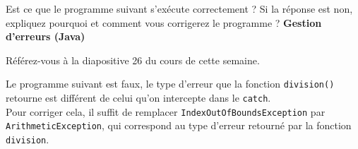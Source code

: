 \begin{Exercice}[5 minutes] Est ce que le programme suivant s'exécute correctement ? Si la réponse est non, expliquez pourquoi et comment vous corrigerez le programme ? \textbf{Gestion d'erreurs (Java)}\\
    

    
     \begin{conseil}
        Référez-vous à la diapositive 26 du cours de cette semaine.           
     \end{conseil}
     \begin{solution}
     Le programme suivant est faux, le type d'erreur que la fonction \lstinline{division()} retourne est différent de celui qu'on intercepte dans le \lstinline{catch}. \\
     Pour corriger cela, il suffit de remplacer \lstinline{IndexOutOfBoundsException} par \lstinline{ArithmeticException}, qui correspond au type d'erreur retourné par la fonction \lstinline{division}.
     \end{solution}   
 \end{Exercice}


